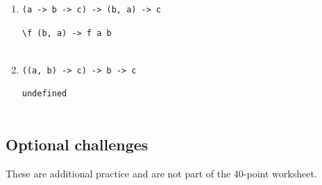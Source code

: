 \documentclass[11pt]{article}
\begin{document}
\begin{enumerate}
\item
\begin{minipage}[t]{\linewidth}
\vspace{-\baselineskip}
\begin{lstlisting}
(a -> b -> c) -> (b, a) -> c
\end{lstlisting}
\begin{lstlisting}[style=answer]
\f (b, a) -> f a b 


\end{lstlisting}
\end{minipage}

\item
\begin{minipage}[t]{\linewidth}
\vspace{-\baselineskip}
\begin{lstlisting}
((a, b) -> c) -> b -> c
\end{lstlisting}
\begin{lstlisting}[style=answer]
undefined


\end{lstlisting}
\end{minipage}

\end{enumerate}

\subsection*{Optional challenges}
These are additional practice and are not part of the 40-point worksheet.
\end{document}
